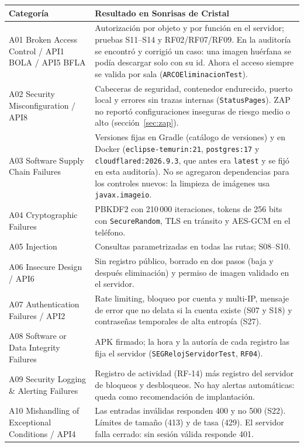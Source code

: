 {\small
\begin{longtable}{p{4.6cm}p{10.4cm}}
\toprule
\textbf{Categoría} & \textbf{Resultado en Sonrisas de Cristal}\\\midrule\endhead
A01 Broken Access Control / API1 BOLA / API5 BFLA & Autorización por objeto y por función en el servidor; pruebas S11--S14 y RF02/RF07/RF09. En la auditoría se encontró y corrigió un caso: una imagen huérfana se podía descargar solo con su id. Ahora el acceso siempre se valida por sala (\texttt{ARCOEliminacion\allowbreak{}Test}).\\
A02 Security Misconfiguration / API8 & Cabeceras de seguridad, contenedor endurecido, puerto local y errores sin trazas internas (\texttt{Status\allowbreak{}Pages}). ZAP no reportó configuraciones inseguras de riesgo medio o alto (sección~\ref{sec:zap}).\\
A03 Software Supply Chain Failures & Versiones fijas en Gradle (catálogo de versiones) y en Docker (\texttt{eclipse-temurin:21}, \texttt{postgres:17} y \texttt{cloudflared:2026.\allowbreak{}9.\allowbreak{}3}, que antes era \texttt{latest} y se fijó en esta auditoría). No se agregaron dependencias para los controles nuevos: la limpieza de imágenes usa \texttt{javax.\allowbreak{}imageio}.\\
A04 Cryptographic Failures & PBKDF2 con 210\,000 iteraciones, tokens de 256 bits con \texttt{Secure\allowbreak{}Random}, TLS en tránsito y AES-GCM en el teléfono.\\
A05 Injection & Consultas parametrizadas en todas las rutas; S08--S10.\\
A06 Insecure Design / API6 & Sin registro público, borrado en dos pasos (baja y después eliminación) y permiso de imagen validado en el servidor.\\
A07 Authentication Failures / API2 & Rate limiting, bloqueo por cuenta y multi-IP, mensaje de error que no delata si la cuenta existe (S07 y S18) y contraseñas temporales de alta entropía (S27).\\
A08 Software or Data Integrity Failures & APK firmado; la hora y la autoría de cada registro las fija el servidor (\texttt{SEGReloj\allowbreak{}Servidor\allowbreak{}Test}, \texttt{RF04}).\\
A09 Security Logging \& Alerting Failures & Registro de actividad (RF-14) más registro del servidor de bloqueos y desbloqueos. No hay alertas automáticas: queda como recomendación de implantación.\\
A10 Mishandling of Exceptional Conditions / API4 & Las entradas inválidas responden 400 y no 500 (S22). Límites de tamaño (413) y de tasa (429). El servidor falla cerrado: sin sesión válida responde 401.\\
\bottomrule
\end{longtable}}

